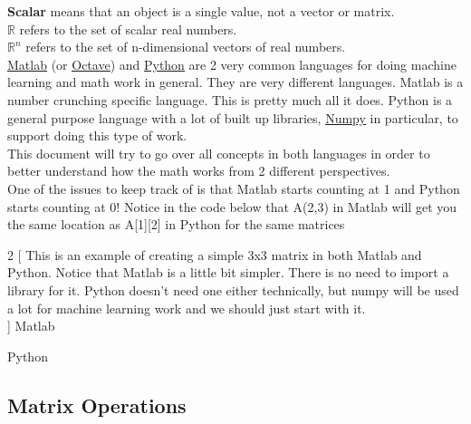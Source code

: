 \textbf{Scalar} means that an object is a single value, not a vector or matrix.\\

$\mathbb{R}$ refers to the set of scalar real numbers.\\

$\mathbb{R}^{n}$ refers to the set of n-dimensional vectors of real numbers.\\


\newpage
\underline{\href{http://www.mathworks.com}{Matlab}} (or \underline{\href{https://www.gnu.org/software/octave/}{Octave}}) and \underline{\href{http://www.python.org}{Python}} are 2 very common languages for doing machine learning and math work in general.  They are very different languages.  Matlab is a number crunching specific language.  This is pretty much all it does.  Python is a general purpose language with a lot of built up libraries, \underline{\href{https://numpy.org/}{Numpy}} in particular,  to support doing this type of work.\\

This document will try to go over all concepts in both languages in order to better understand how the math works from 2 different perspectives.\\

One of the issues to keep track of is that Matlab starts counting at 1 and Python starts counting at 0!  Notice in the code below that A(2,3) in Matlab will get you the same location as A[1][2] in Python for the same matrices\\

\begin{multicols}{2}
  [
    This is an example of creating a simple 3x3 matrix in both Matlab and Python.  Notice that Matlab is a little bit simpler.  There is no need to import a library for it.  Python doesn't need one either technically, but numpy will be used a lot for machine learning work and we should just start with it.\\
  ]
  Matlab\\
  \columnbreak

  Python\\
  
\end{multicols}

\subsection{Matrix Operations}
